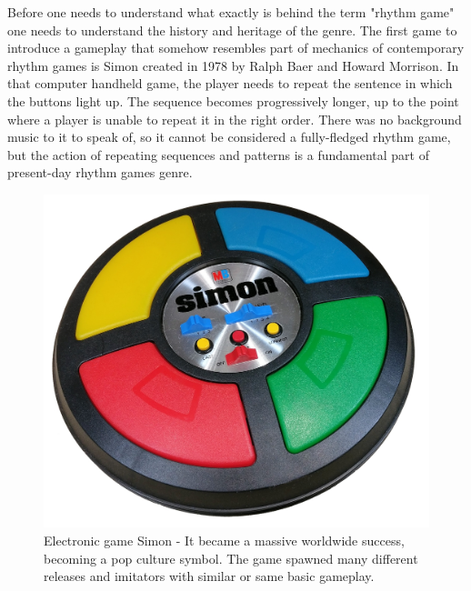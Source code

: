 Before one needs to understand what exactly is behind the term "rhythm game" one needs to understand the history and heritage of the genre. The first game to introduce a gameplay that somehow resembles part of mechanics of contemporary rhythm games is Simon created in 1978 by Ralph Baer and Howard Morrison. In that computer handheld game, the player needs to repeat the sentence in which the buttons light up. The sequence becomes progressively longer, up to the point where a player is unable to repeat it in the right order. There was no background music to it to speak of, so it cannot be considered a fully-fledged rhythm game, but the action of repeating sequences and patterns is a fundamental part of present-day rhythm games genre.

\begin{figure}[h]
    \centering\includegraphics[scale=0.15]{obrazki/simon.jpg}
    \caption{Electronic game Simon - It became a massive worldwide success, becoming a pop culture symbol. The game spawned many different releases and imitators with similar or same basic gameplay. \cite{simongame}}
    \label{fig:simon_game}
\end{figure}

